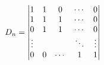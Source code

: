 \documentclass[preview]{standalone}
\begin{document}
\begin{align*}
\special{dvisvgm:raw <g id='unique000'>}D_n=\begin{vmatrix}1&1&0&\cdots&0\\1&1&1&\cdots&0\\0&1&1&\cdots&0\\\vdots&&&\ddots&\vdots\\0&0&\cdots&1&1\end{vmatrix}\special{dvisvgm:raw </g>}
\end{align*}
\end{document}
